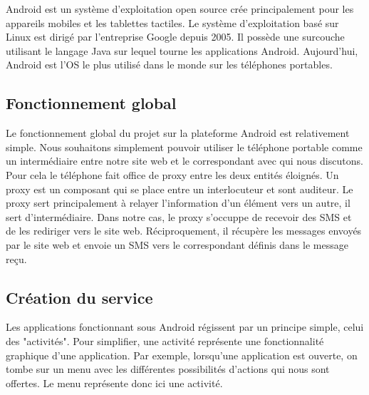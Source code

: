 Android est un système d'exploitation open source crée principalement pour les appareils mobiles et 
les tablettes tactiles. Le système d'exploitation basé sur Linux est dirigé par l'entreprise Google
depuis 2005. Il possède une surcouche utilisant le langage Java sur lequel tourne les applications 
Android.
Aujourd'hui, Android est l'OS le plus utilisé dans le monde sur les téléphones portables.



\subsection{Fonctionnement global}



Le fonctionnement global du projet sur la plateforme Android est relativement simple. Nous souhaitons
simplement pouvoir utiliser le téléphone portable comme un intermédiaire entre notre site web et le 
correspondant avec qui nous discutons. Pour cela le téléphone fait office de proxy entre les deux 
entités éloignés. Un proxy est un composant qui se place entre un interlocuteur et sont auditeur. Le 
proxy sert principalement à relayer l'information d'un élément vers un autre, il sert d'intermédiaire.
Dans notre cas, le proxy s'occuppe de recevoir des SMS et de les rediriger vers le site web. 
Réciproquement, il récupère les messages envoyés par le site web et envoie un SMS vers le correspondant
définis dans le message reçu.



\subsection{Création du service}



Les applications fonctionnant sous Android régissent par un principe simple, celui des "activités".
Pour simplifier, une activité représente une fonctionnalité graphique d'une application. Par exemple,
lorsqu'une application est ouverte, on tombe sur un menu avec les différentes possibilités d'actions 
qui nous sont offertes. Le menu représente donc ici une activité. 
\\


